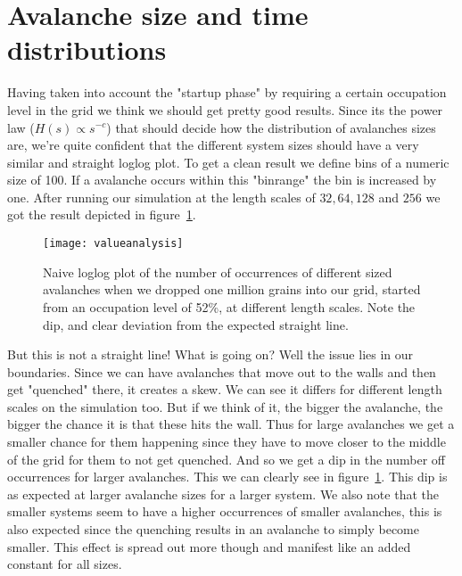 \documentclass[11pt]{article}
\begin{document}
\newpage
\section{Avalanche size and time distributions}
Having taken into account the "startup phase" by requiring a certain occupation level in the grid we think we should get pretty good results. Since its the power law ($H(s) \propto s^{-c}$) that should decide how the distribution of avalanches sizes are, we're quite confident that the different system sizes should have a very similar and straight loglog plot. To get a clean result we define bins of a numeric size of 100. If a avalanche occurs within this "binrange" the bin is increased by one. After running our simulation at the length scales of $32,64,128$ and $256$ we got the result depicted in figure~\ref{fig:valueanalysis}.
\begin{figure}[H]
        \centering
        \texttt{[image: valueanalysis]}
        \caption{Naive loglog plot of the number of occurrences of different sized avalanches when we  dropped one million grains into our grid, started from an occupation level of 52\%, at different length scales. Note the dip, and clear deviation from the expected straight line.}
        \label{fig:valueanalysis}
\end{figure}
But this is not a straight line! What is going on? Well the issue lies in our boundaries. Since we can have avalanches that move out to the walls and then get "quenched" there, it creates a skew. We can see it differs for different length scales on the  simulation too. But if we think of it, the bigger the avalanche, the bigger the chance it is that these hits the wall. Thus for large avalanches we get a smaller chance for them happening since they have to move closer to the middle of the grid for them to not get quenched. And so we get a dip in the number off occurrences for larger avalanches. This we can clearly see in figure~\ref{fig:valueanalysis}. This dip is as expected at larger avalanche sizes for a larger  system. We also note that the smaller systems seem to have a higher occurrences of smaller avalanches, this is also expected since the quenching results in an avalanche to simply become smaller. This effect is spread out more though and manifest like an added constant for all sizes.
\end{document}
